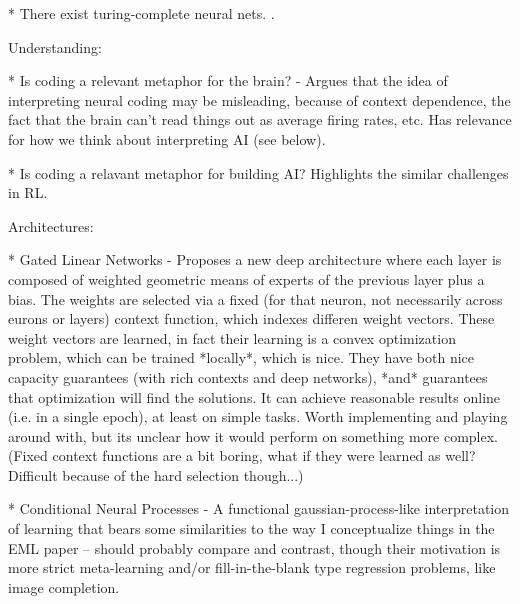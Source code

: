 * There exist turing-complete neural nets. \citep{Siegelman1992}.


Understanding:

* Is coding a relevant metaphor for the brain? - Argues that the idea of interpreting neural coding may be misleading, because of context dependence, the fact that the brain can't read things out as average firing rates, etc. Has relevance for how we think about interpreting AI (see below). \citep{Brette2019} 

* Is coding a relavant metaphor for building AI? Highlights the similar challenges in RL. \citep{Santoro2019}

Architectures:

* Gated Linear Networks - Proposes a new deep architecture where each layer is composed of weighted geometric means of experts of the previous layer plus a bias. The weights are selected via a fixed (for that neuron, not necessarily across eurons or layers) context function, which indexes differen weight vectors. These weight vectors are learned, in fact their learning is a convex optimization problem, which can be trained *locally*, which is nice. They have both nice capacity guarantees (with rich contexts and deep networks), *and* guarantees that optimization will find the solutions. It can achieve reasonable results online (i.e. in a single epoch), at least on simple tasks. Worth implementing and playing around with, but its unclear how it would perform on something more complex. (Fixed context functions are a bit boring, what if they were learned as well? Difficult because of the hard selection though...) \citep{Veness2017} 

* Conditional Neural Processes - A functional gaussian-process-like interpretation of learning that bears some similarities to the way I conceptualize things in the EML paper -- should probably compare and contrast, though their motivation is more strict meta-learning and/or fill-in-the-blank type regression problems, like image completion. \citep{Garnelo2018}


